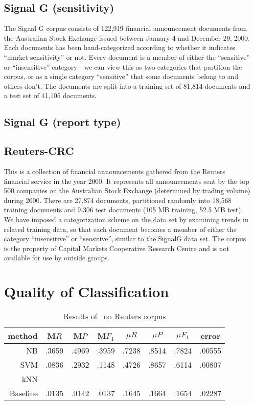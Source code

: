 \subsection{Signal G (sensitivity)}

The Signal G corpus consists of 122,919 financial announcement documents from
the Australian Stock Exchange issued between January 4 and December 29, 2000.
Each documents has been hand-categorized according to whether it indicates
``market sensitivity'' or not.  Every document is a member of either the
``sensitive'' or ``insensitive'' category---we can view this as two
categories that partition the corpus, or as a single category
``sensitive'' that some documents belong to and others don't.  The
documents are split into a training set of 81,814 documents and a test
set of 41,105 documents.

\subsection{Signal G (report type)}

\subsection{Reuters-CRC}
This is a collection of financial announcements gathered from the
Reuters financial service in the year 2000.  It represents all
announcements sent by the top 500 companies on the Australian Stock
Exchange (determined by trading volume) during 2000.  There are 27,874
documents, partitioned randomly into 18,568 training documents and
9,306 test documents (105 MB training, 52.5 MB test).  We have imposed
a categorization scheme on the data set by examining trends in related
training data, so that each document becomes a member of either the
category ``insensitive'' or ``sensitive'', similar to the SignalG data
set.  The corpus is the property of Capital Markets Cooperative
Research Centre and is not available for use by outside groups.


\section{Quality of Classification}
\label{Quality}

\begin{table}
\begin{tabular}{|r c c c c c c c|}
\hline
method & M$R$ & M$P$ & M$F_1$ & $\mu R$ & $\mu P$ & $\mu F_1$ & error \\
\hline
NB       & .3659 & .4969 & .3959 & .7238 & .8514 & .7824 & .00555 \\
SVM      & .0836 & .2932 & .1148 & .4726 & .8657 & .6114 & .00807 \\
kNN      & \\
Baseline & .0135 & .0142 & .0137 & .1645 & .1664 & .1654 & .02287 \\
\hline
\end{tabular}
\caption{Results of \aicat\ on Reuters corpus}
\end{table}

